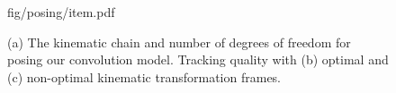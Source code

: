 \begin{figure}[t!]
\centering
\begin{overpic} 
[width=\linewidth]
{fig/posing/item.pdf}
\end{overpic}
\caption{
% 
% 
(a) The kinematic chain and number of degrees of freedom for posing our convolution model.
Tracking quality with (b) optimal and (c) non-optimal kinematic transformation frames.
% 
% 
}
\label{fig:posing}
\end{figure}